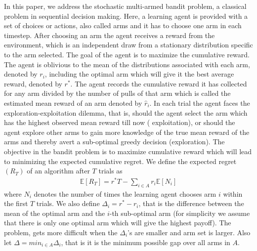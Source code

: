 In this paper, we address the stochastic multi-armed bandit problem, a classical problem in sequential decision making. Here, a learning agent is provided with a set of choices or actions, also called arms and it has to choose one arm in each timestep. After choosing an arm the agent receives a reward from the environment, which is an independent draw from a stationary distribution specific to the arm selected. The goal of the agent is to maximize the cumulative reward. The agent is oblivious to the mean of the distributions associated with each arm, denoted by $r_{i}$, including the optimal arm which will give it the best average reward, denoted by $r^{*}$. The agent records the cumulative reward it has collected for any arm divided by the number of pulls of that arm which is called the estimated mean reward of an arm denoted by $\hat{r}_{i}$. In each trial the agent faces the exploration-exploitation dilemma, that is, should the agent select the arm which has the highest observed mean reward till now (
exploitation), or should the agent explore other arms to gain more knowledge of the true mean reward of the arms and thereby avert a sub-optimal greedy decision (exploration). The objective in the bandit problem is to maximize cumulative reward which will lead to minimizing the expected cumulative regret. We define the expected regret $(R_{T})$ of an algorithm after $T$ trials as
\begin{align*}
\mathbb{E}[R_{T}]=r^{*}T - \sum_{i\in A} r_{i}\mathbb{E}[N_{i}]
\end{align*}
where $N_{i}$ denotes the number of times the learning agent chooses arm $i$ within the first $T$ trials. We also define $\Delta_{i}=r^{*}-r_{i}$, that is the difference between the mean of the optimal arm and the $i$-th sub-optimal arm (for simplicity we assume that there is only one optimal arm which will give the highest payoff). The problem, gets more difficult when the $\Delta_{i}$'s are smaller and arm set is larger. Also let $\Delta=min_{i\in A}\Delta_{i}$, that is it is the minimum possible gap over all arms in $A$.
                                                                                                                                          


